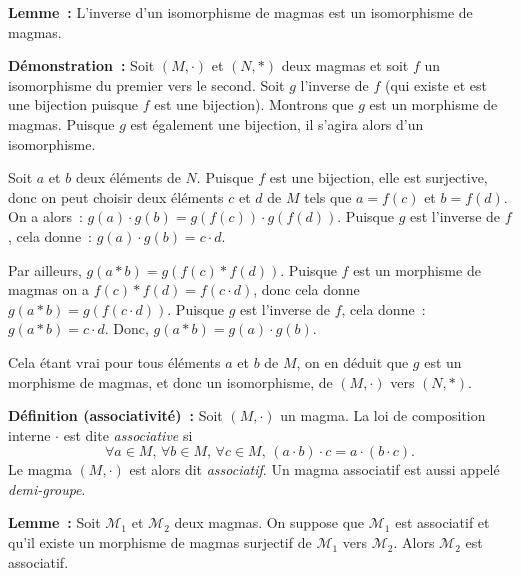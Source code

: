 \medskip

\noindent\textbf{Lemme :} L'inverse d'un isomorphisme de magmas est un isomorphisme de magmas.

\medskip

\noindent\textbf{Démonstration :} Soit $\left(M, \cdot \right)$ et $\left(N, \ast \right)$ deux magmas et soit $f$ un isomorphisme du premier vers le second. 
    Soit $g$ l'inverse de $f$ (qui existe et est une bijection puisque $f$ est une bijection). 
    Montrons que $g$ est un morphisme de magmas. 
    Puisque $g$ est également une bijection, il s'agira alors d'un isomorphisme. 

    Soit $a$ et $b$ deux éléments de $N$. 
    Puisque $f$ est une bijection, elle est surjective, donc on peut choisir deux éléments $c$ et $d$ de $M$ tels que $a = f(c)$ et $b = f(d)$. 
    On a alors : $g(a) \cdot g(b) = g(f(c)) \cdot g(f(d))$.
    Puisque $g$ est l'inverse de $f$, cela donne : $g(a) \cdot g(b) = c \cdot d$. 

    Par ailleurs, $g(a \ast b) = g(f(c) \ast f(d))$. 
    Puisque $f$ est un morphisme de magmas on a $f(c) \ast f(d) = f (c \cdot d)$, donc cela donne $g(a \ast b) = g(f(c \cdot d))$.
    Puisque $g$ est l'inverse de $f$, cela donne : $g(a \ast b) = c \cdot d$. 
    Donc, $g(a \ast b) = g(a) \cdot g(b)$. 

    Cela étant vrai pour tous éléments $a$ et $b$ de $M$, on en déduit que $g$ est un morphisme de magmas, et donc un isomorphisme, de $\left(M, \cdot \right)$ vers $\left(N, \ast \right)$.

    \hfill \square

\medskip

\noindent\textbf{Définition (associativité) :} Soit $(M,\cdot)$ un magma.
    La loi de composition interne $\cdot$ est dite \textit{associative} si
    \begin{equation*}
        \forall a \in M, \, \forall b \in M, \, \forall c \in M , \,  
        (a \cdot b) \cdot c = a \cdot (b \cdot c).
    \end{equation*}
    Le magma $(M, \cdot)$ est alors dit \textit{associatif}. 
    Un magma associatif est aussi appelé \textit{demi-groupe}.

\medskip

\noindent\textbf{Lemme :} Soit $\mathcal{M}_1$ et $\mathcal{M}_2$ deux magmas.
    On suppose que $\mathcal{M}_1$ est associatif et qu'il existe un morphisme de magmas surjectif de $\mathcal{M}_1$ vers $\mathcal{M}_2$.
    Alors $\mathcal{M}_2$ est associatif.

